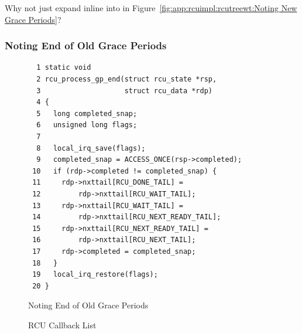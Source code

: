 \QuickQuiz{}
	Why not just expand  inline into
	 in
	Figure~\ref{fig:app:rcuimpl:rcutreewt:Noting New Grace Periods}?
 \QuickQuizEnd

\subsubsection{Noting End of Old Grace Periods}
\label{app:rcuimpl:rcutreewt:Noting End of Old Grace Periods}

\begin{figure}[tbp]
{ \scriptsize
\begin{verbatim}
  1 static void
  2 rcu_process_gp_end(struct rcu_state *rsp,
  3                    struct rcu_data *rdp)
  4 {
  5   long completed_snap;
  6   unsigned long flags;
  7
  8   local_irq_save(flags);
  9   completed_snap = ACCESS_ONCE(rsp->completed);
 10   if (rdp->completed != completed_snap) {
 11     rdp->nxttail[RCU_DONE_TAIL] =
 12         rdp->nxttail[RCU_WAIT_TAIL];
 13     rdp->nxttail[RCU_WAIT_TAIL] =
 14         rdp->nxttail[RCU_NEXT_READY_TAIL];
 15     rdp->nxttail[RCU_NEXT_READY_TAIL] =
 16         rdp->nxttail[RCU_NEXT_TAIL];
 17     rdp->completed = completed_snap;
 18   }
 19   local_irq_restore(flags);
 20 }
\end{verbatim}
}
\caption{Noting End of Old Grace Periods}
\label{fig:app:rcuimpl:rcutreewt:Noting End of Old Grace Periods}
\end{figure}

\begin{figure}[tb]
\begin{center}
\end{center}
\caption{RCU Callback List}
\label{fig:app:rcuimpl:rcutree:RCU Callback List}
\end{figure}


